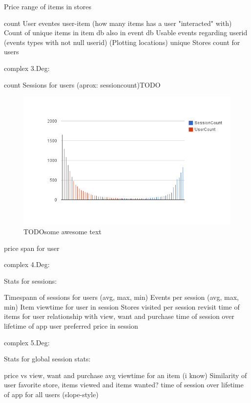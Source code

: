         Price range of items in stores



        count User eventes
        user-item (how many items has a user "interacted" with)
        Count of unique items in item db also in event db
        Usable events regarding userid (events types with not null userid)
        (Plotting locations)
        unique Stores count for users

    complex 3.Deg:

        count Sessions for users (aprox: sessioncount)TODO

\begin{figure}[H]
    \includegraphics[width=5in]{image/global_sessioncount.png}
    \centering
    \caption[Count of sessions per user mapped with count of user with give
    session amount]{TODOsome awesome text}
\end{figure}

        price span for user

    complex 4.Deg:

        Stats for sessions:

            Timespann of sessions for users (avg, max, min)
            Events per session (avg, max, min)
            Item viewtime for user in session
            Stores visited per session
            revisit time of items for user
            relationship with view, want and purchase
            time of session over lifetime of app
            user preferred price in session

    complex 5.Deg:

        Stats for global session stats:

            price vs view, want and purchase
            avg viewtime for an item (i know)
            Similarity of user favorite store, items viewed and items wanted?
            time of session over lifetime of app for all users (slope-style)

